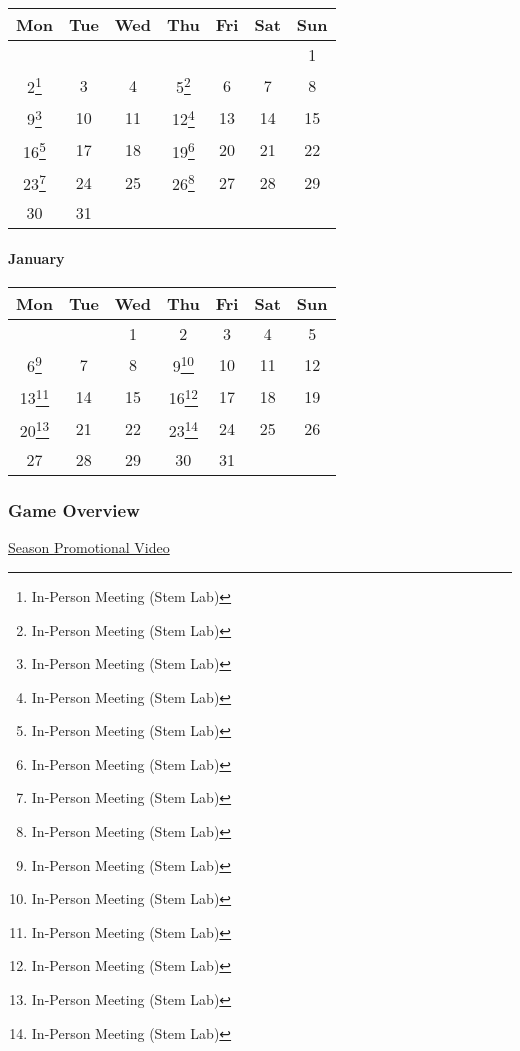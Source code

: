 \begin{longtable}[]{@{}ccccccc@{}}
\toprule\noalign{}
Mon & Tue & Wed & Thu & Fri & Sat & Sun \\
\midrule\noalign{}
\endhead
\bottomrule\noalign{}
\endlastfoot
& & & & & & 1 \\
2\footnote{In-Person Meeting (Stem Lab)} & 3 & 4 & 5\footnote{In-Person
  Meeting (Stem Lab)} & 6 & 7 & 8 \\
9\footnote{In-Person Meeting (Stem Lab)} & 10 & 11 & 12\footnote{In-Person
  Meeting (Stem Lab)} & 13 & 14 & 15 \\
16\footnote{In-Person Meeting (Stem Lab)} & 17 & 18 & 19\footnote{In-Person
  Meeting (Stem Lab)} & 20 & 21 & 22 \\
23\footnote{In-Person Meeting (Stem Lab)} & 24 & 25 & 26\footnote{In-Person
  Meeting (Stem Lab)} & 27 & 28 & 29 \\
30 & 31 & & & & & \\
\end{longtable}

\hypertarget{january}{%
\paragraph{January}\label{january}}

\begin{longtable}[]{@{}ccccccc@{}}
\toprule\noalign{}
Mon & Tue & Wed & Thu & Fri & Sat & Sun \\
\midrule\noalign{}
\endhead
\bottomrule\noalign{}
\endlastfoot
& & 1 & 2 & 3 & 4 & 5 \\
6\footnote{In-Person Meeting (Stem Lab)} & 7 & 8 & 9\footnote{In-Person
  Meeting (Stem Lab)} & 10 & 11 & 12 \\
13\footnote{In-Person Meeting (Stem Lab)} & 14 & 15 & 16\footnote{In-Person
  Meeting (Stem Lab)} & 17 & 18 & 19 \\
20\footnote{In-Person Meeting (Stem Lab)} & 21 & 22 & 23\footnote{In-Person
  Meeting (Stem Lab)} & 24 & 25 & 26 \\
27 & 28 & 29 & 30 & 31 & & \\
\end{longtable}

\hypertarget{game-overview}{%
\subsubsection{Game Overview}\label{game-overview}}

\href{https://youtu.be/c2f-Q5GGt2Q}{Season Promotional Video}


